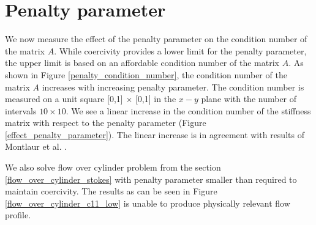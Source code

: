 \documentclass[a4paper,twoside,openright]{book}
\begin{document}
\section{Penalty parameter}

We now measure the effect of the penalty parameter on the condition number of the matrix $A$. While coercivity provides a lower limit for the penalty parameter, the upper limit is based on an affordable condition number of the matrix $A$. As shown in Figure \ref{penalty_condition_number}, the condition number of the matrix $A$ increases with increasing penalty parameter.
The condition number is measured on a unit square [0,1] $\times$ [0,1] in the $x-y$ plane with the number of intervals $10 \times 10$. We see a linear increase in the condition number of the stiffness matrix with respect to the penalty parameter (Figure \ref{effect_penalty_parameter}). The linear increase is in agreement with results of Montlaur et al. \cite{Montlaur}.

We also solve flow over cylinder problem from the section \ref{flow_over_cylinder_stokes} with penalty parameter smaller than required to maintain coercivity. The results as can be seen in Figure \ref{flow_over_cylinder_c11_low} is unable to produce physically relevant flow profile.
\end{document}
